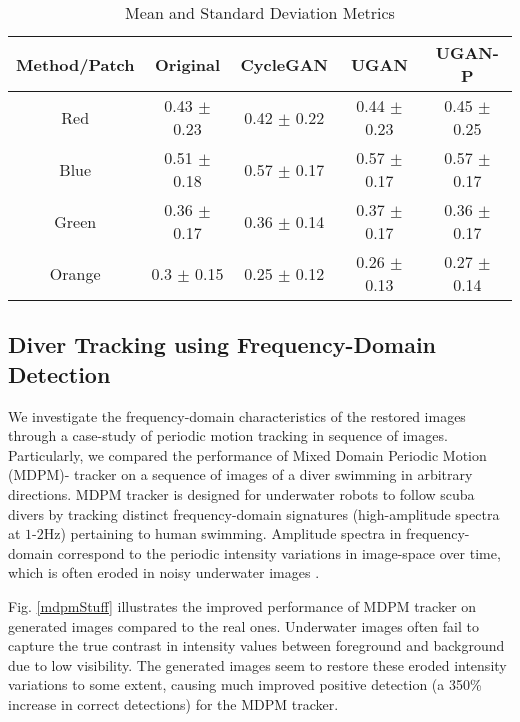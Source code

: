 \begin{table*}[ht]
\centering
\caption{Mean and Standard Deviation Metrics}
\begin{tabular}{| c | c | c | c | c | }
   \hline
   Method/Patch & Original & CycleGAN & \textbf{UGAN} & \textbf{UGAN-P} \\ 
\hline
   Red & 0.43 $\pm$ 0.23 & 0.42 $\pm$ 0.22 & 0.44 $\pm$ 0.23 & 0.45 $\pm$ 0.25 \\ \hline
   Blue & 0.51 $\pm$ 0.18 & 0.57 $\pm$ 0.17 & 0.57 $\pm$ 0.17 & 0.57 $\pm$ 0.17 \\ \hline
   Green & 0.36 $\pm$ 0.17 & 0.36 $\pm$ 0.14 & 0.37 $\pm$ 0.17 & 0.36 $\pm$ 0.17 \\ \hline
   Orange & 0.3 $\pm$ 0.15 & 0.25 $\pm$ 0.12 & 0.26 $\pm$ 0.13 & 0.27 $\pm$ 0.14 \\ \hline
\end{tabular}
\label{fig:mean_tbl}
\end{table*}

\subsection{Diver Tracking using Frequency-Domain Detection}
We investigate the frequency-domain characteristics of the restored images through a case-study of periodic motion tracking in 
sequence of images. Particularly, we compared the performance of Mixed Domain Periodic Motion (MDPM)- tracker 
\cite{islam2017mixed} on a sequence of images of a diver swimming in  arbitrary directions. MDPM tracker is designed for 
underwater robots to follow scuba divers by   tracking distinct frequency-domain signatures (high-amplitude spectra at $1$-$2$Hz) 
pertaining to human swimming. Amplitude spectra in frequency-domain correspond to the periodic intensity variations in image-space 
over time, which is often eroded in noisy underwater images \cite{shkurti2017underwater}.

Fig. \ref{mdpmStuff} illustrates the improved performance of MDPM tracker on generated images compared to the real ones. 
Underwater images often fail to capture the true contrast in intensity values between foreground and background due to low 
visibility. The generated images seem to restore these eroded intensity variations to some extent, causing much improved positive 
detection (a 350\% increase in correct detections) for the MDPM tracker.

